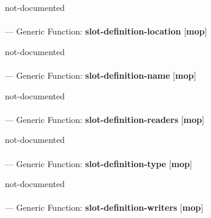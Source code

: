 \begin{adjustwidth}{5em}{5em}
not-documented
\end{adjustwidth}

\paragraph{}
\label{MOP:SLOT-DEFINITION-LOCATION}
--- Generic Function: \textbf{slot-definition-location} [\textbf{mop}] \textit{}

\begin{adjustwidth}{5em}{5em}
not-documented
\end{adjustwidth}

\paragraph{}
\label{MOP:SLOT-DEFINITION-NAME}
--- Generic Function: \textbf{slot-definition-name} [\textbf{mop}] \textit{}

\begin{adjustwidth}{5em}{5em}
not-documented
\end{adjustwidth}

\paragraph{}
\label{MOP:SLOT-DEFINITION-READERS}
--- Generic Function: \textbf{slot-definition-readers} [\textbf{mop}] \textit{}

\begin{adjustwidth}{5em}{5em}
not-documented
\end{adjustwidth}

\paragraph{}
\label{MOP:SLOT-DEFINITION-TYPE}
--- Generic Function: \textbf{slot-definition-type} [\textbf{mop}] \textit{}

\begin{adjustwidth}{5em}{5em}
not-documented
\end{adjustwidth}

\paragraph{}
\label{MOP:SLOT-DEFINITION-WRITERS}
--- Generic Function: \textbf{slot-definition-writers} [\textbf{mop}] \textit{}

